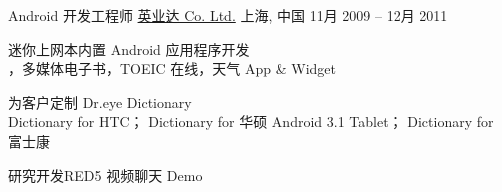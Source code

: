 \begin{cventries}
	\cventry
	{Android 开发工程师}
	{\href{http://www.inventec.com/english/indexEN.htm}{英业达 Co. Ltd.}}
	{上海, \enskip 中国}
	{11月 2009 – 12月 2011}
	{
		\begin{cvitems}
			\item {\href{http://www.androidcentral.com/android-powered-dr-eye-makes-its-debut}{\color{deepblue}{Dr.eye}} 迷你上网本内置 Android 应用程序开发\\
			\href{https://play.google.com/store/apps/details?id=com.inventec.dreye.dictnew}{\color{deepblue}{Dr.eye 辞典}}，多媒体电子书，TOEIC 在线，天气 App \& Widget}
			\item {为客户定制 Dr.eye Dictionary\\
			Dictionary for HTC；
			Dictionary for 华硕 Android 3.1 Tablet；
			Dictionary for 富士康}
			\item {研究开发RED5 视频聊天 Demo}
			\\
			\\
			\\
			\\
			\\
			\\
		\end{cvitems}
	}
\end{cventries}

